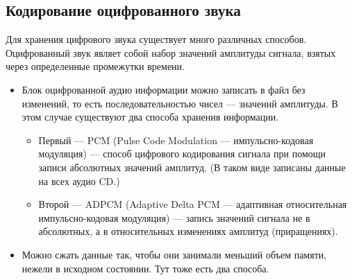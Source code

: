 \documentclass[a4paper]{report}
\begin{document}
\subsection{Кодирование оцифрованного звука}
Для хранения цифрового звука существует много различных способов. Оцифрованный звук являет собой набор значений амплитуды сигнала, взятых через определенные промежутки времени.
\begin{itemize}
\item Блок оцифрованной аудио информации можно записать в файл без изменений, то есть последовательностью чисел — значений амплитуды. В этом случае существуют два способа хранения информации.
\begin{itemize}
\item Первый — PCM (Pulse Code Modulation — импульсно-кодовая модуляция) — способ цифрового кодирования сигнала при помощи записи абсолютных значений амплитуд. (В таком виде записаны данные на всех аудио CD.)
\item Второй — ADPCM (Adaptive Delta PCM — адаптивная относительная импульсно-кодовая модуляция) — запись значений сигнала не в абсолютных, а в относительных изменениях амплитуд (приращениях).
\end{itemize}
\item Можно сжать данные так, чтобы они занимали меньший объем памяти, нежели в исходном состоянии. Тут тоже есть два способа.
\begin{itemize}



\end{itemize}
\end{itemize}
\end{document}
